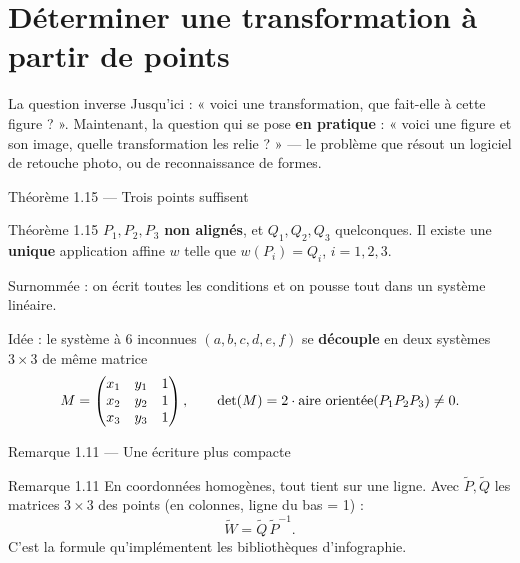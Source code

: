\section{Déterminer une transformation à partir de points}

\begin{frame}{La question inverse}
  \small Jusqu'ici : « voici une transformation, que fait-elle à cette
  figure ? ». Maintenant, la question qui se pose \textbf{en pratique} :
  « voici une figure et son image, quelle transformation les relie ? »
  --- le problème que résout un logiciel de retouche photo, ou de
  reconnaissance de formes.
\end{frame}

\begin{frame}{Théorème 1.15 --- Trois points suffisent}
  \begin{Enonce}{Théorème 1.15}
    \small $P_1,P_2,P_3$ \textbf{non alignés}, et $Q_1,Q_2,Q_3$
    quelconques. Il existe une \textbf{unique} application affine $w$
    telle que $w(P_i)=Q_i$, $i=1,2,3$.
  \end{Enonce}
  \small Surnommée  : on écrit toutes les
  conditions et on pousse tout dans un système linéaire.
  \begin{AuTableau}
    \small Idée : le système à 6 inconnues $(a,b,c,d,e,f)$ se
    \textbf{découple} en deux systèmes $3\times 3$ de même matrice
    \[
      M = \begin{pmatrix} x_1&y_1&1\\x_2&y_2&1\\x_3&y_3&1\end{pmatrix},
      \qquad \operatorname{det}(M) = 2\cdot\text{aire orientée}(P_1P_2P_3) \neq 0.
    \]
  \end{AuTableau}
\end{frame}

\begin{frame}{Remarque 1.11 --- Une écriture plus compacte}
  \begin{Rem}{Remarque 1.11}
    \small En coordonnées homogènes, tout tient sur une ligne. Avec
    $\widetilde P,\widetilde Q$ les matrices $3\times3$ des points
    (en colonnes, ligne du bas = 1) :
    \[
      \widetilde W = \widetilde Q\,\widetilde P^{-1}.
    \]
    C'est la formule qu'implémentent les bibliothèques d'infographie.
  \end{Rem}
\end{frame}

